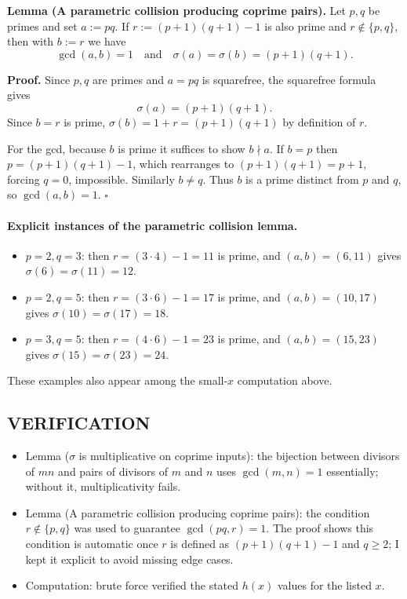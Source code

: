 \noindent\textbf{Lemma (A parametric collision producing coprime pairs).}
Let $p,q$ be primes and set $a:=pq$. If $r:=(p+1)(q+1)-1$ is also prime and $r\notin\{p,q\}$, then with $b:=r$ we have
\[
\gcd(a,b)=1\quad\text{and}\quad \sigma(a)=\sigma(b)=(p+1)(q+1).
\]

\noindent\textbf{Proof.}
Since $p,q$ are primes and $a=pq$ is squarefree, the squarefree formula gives
\[
\sigma(a)=(p+1)(q+1).
\]
Since $b=r$ is prime, $\sigma(b)=1+r=(p+1)(q+1)$ by definition of $r$.

For the gcd, because $b$ is prime it suffices to show $b\nmid a$. If $b=p$ then
$p=(p+1)(q+1)-1$, which rearranges to $(p+1)(q+1)=p+1$, forcing $q=0$, impossible. Similarly $b\ne q$.
Thus $b$ is a prime distinct from $p$ and $q$, so $\gcd(a,b)=1$.
\hfill$\square$


\paragraph{Explicit instances of the parametric collision lemma.}
\begin{itemize}
\item $p=2,q=3$: then $r=(3\cdot 4)-1=11$ is prime, and $(a,b)=(6,11)$ gives $\sigma(6)=\sigma(11)=12$.
\item $p=2,q=5$: then $r=(3\cdot 6)-1=17$ is prime, and $(a,b)=(10,17)$ gives $\sigma(10)=\sigma(17)=18$.
\item $p=3,q=5$: then $r=(4\cdot 6)-1=23$ is prime, and $(a,b)=(15,23)$ gives $\sigma(15)=\sigma(23)=24$.
\end{itemize}
These examples also appear among the small-$x$ computation above.

\subsection*{VERIFICATION}
\begin{itemize}
\item Lemma ($\sigma$ is multiplicative on coprime inputs): the bijection between divisors of $mn$ and pairs of divisors of $m$ and $n$ uses $\gcd(m,n)=1$ essentially; without it, multiplicativity fails.
\item Lemma (A parametric collision producing coprime pairs): the condition $r\notin\{p,q\}$ was used to guarantee $\gcd(pq,r)=1$. The proof shows this condition is automatic once $r$ is defined as $(p+1)(q+1)-1$ and $q\ge 2$; I kept it explicit to avoid missing edge cases.
\item Computation: brute force verified the stated $h(x)$ values for the listed $x$.
\end{itemize}

